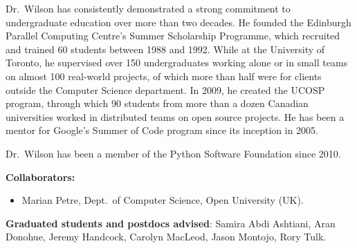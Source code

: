 \documentclass{proposalnsf}
\newlength{\up}
\begin{document}
Dr.\ Wilson has consistently demonstrated a strong commitment to undergraduate education over more than two decades.
He founded the Edinburgh Parallel Computing Centre's Summer Scholarship Programme,
which recruited and trained 60 students between 1988 and 1992.
While at the University of Toronto,
he supervised over 150 undergraduates working alone or in small teams on almost 100 real-world projects,
of which more than half were for clients outside the Computer Science department.
In 2009, he created the UCOSP program,
through which 90 students from more than a dozen Canadian universities worked in distributed teams on open source projects.
He has been a mentor for Google's Summer of Code program since its inception in 2005.

Dr.\ Wilson has been a member of the Python Software Foundation since 2010.

\textbf{Collaborators:} %
\vspace{\up}

\begin{itemize}
\item Marian Petre, Dept.\ of Computer Science, Open University (UK).
\end{itemize}

\textbf{Graduated students and postdocs advised}: Samira Abdi Ashtiani, Aran Donohue, Jeremy Handcock, Carolyn MacLeod, Jason Montojo, Rory Tulk.
\end{document}

